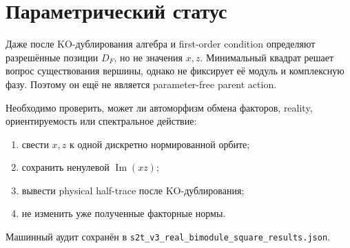 \section{Параметрический статус}

Даже после KO-дублирования алгебра и first-order condition определяют
разрешённые позиции \(D_F\), но не значения \(x,z\). Минимальный квадрат
решает вопрос существования вершины, однако не фиксирует её модуль и
комплексную фазу. Поэтому он ещё не является parameter-free parent action.

\begin{protocol}
Необходимо проверить, может ли автоморфизм обмена факторов, reality,
ориентируемость или спектральное действие:
\begin{enumerate}
 \item свести \(x,z\) к одной дискретно нормированной орбите;
 \item сохранить ненулевой \(\operatorname{Im}(xz)\);
 \item вывести physical half-trace после KO-дублирования;
 \item не изменить уже полученные факторные нормы.
\end{enumerate}
\end{protocol}

Машинный аудит сохранён в
\texttt{s2t\_v3\_real\_bimodule\_square\_results.json}.
